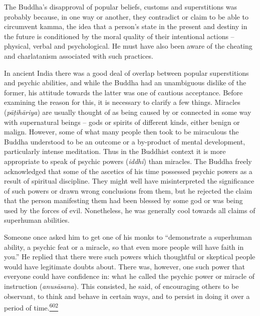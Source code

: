 The Buddha's disapproval of popular beliefs, customs and superstitions
was probably because, in one way or another, they contradict or claim to
be able to circumvent kamma, the idea that a person's state in the
present and destiny in the future is conditioned by the moral quality of
their intentional actions -- physical, verbal and psychological. He must
have also been aware of the cheating and charlatanism associated with
such practices.

In ancient India there was a good deal of overlap between popular
superstitions and psychic abilities, and while the Buddha had an
unambiguous dislike of the former, his attitude towards the latter was
one of cautious acceptance. Before examining the reason for this, it is
necessary to clarify a few things. Miracles (\emph{pāṭihāriya}) are
usually thought of as being caused by or connected in some way with
supernatural beings -- gods or spirits of different kinds, either benign
or malign. However, some of what many people then took to be miraculous
the Buddha understood to be an outcome or a by-product of mental
development, particularly intense meditation. Thus in the Buddhist
context it is more appropriate to speak of psychic powers (\emph{iddhi})
than miracles. The Buddha freely acknowledged that some of the ascetics
of his time possessed psychic powers as a result of spiritual
discipline. They might well have misinterpreted the significance of such
powers or drawn wrong conclusions from them, but he rejected the claim
that the person manifesting them had been blessed by some god or was
being used by the forces of evil. Nonetheless, he was generally cool
towards all claims of superhuman abilities.

Someone once asked him to get one of his monks to ``demonstrate a
superhuman ability, a psychic feat or a miracle, so that even more
people will have faith in you.'' He replied that there were such powers
which thoughtful or skeptical people would have legitimate doubts about.
There was, however, one such power that everyone could have confidence
in: what he called the psychic power or miracle of instruction
(\emph{anusāsana}). This consisted, he said, of encouraging others to be
observant, to think and behave in certain ways, and to persist in doing
it over a period of
time.\label{footprints_split_015.html_fnref602}\hyperref[footprints_split_025.htmlux5cux23fn602]{\textsuperscript{602}}

